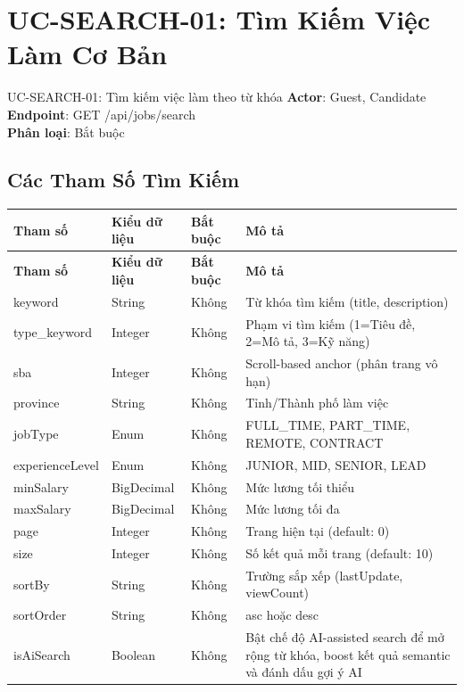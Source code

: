 \documentclass[12pt, a4paper]{report}
\begin{document}
\section{UC-SEARCH-01: Tìm Kiếm Việc Làm Cơ Bản}

\begin{requirementbox}{UC-SEARCH-01: Tìm kiếm việc làm theo từ khóa}
\textbf{Actor}: Guest, Candidate \\
\textbf{Endpoint}: GET /api/jobs/search \\
\textbf{Phân loại}: Bắt buộc
\end{requirementbox}

\subsection{Các Tham Số Tìm Kiếm}

\begin{longtable}{|p{3.5cm}|p{2.5cm}|p{2.5cm}|p{5cm}|}
\hline
\textbf{Tham số} & \textbf{Kiểu dữ liệu} & \textbf{Bắt buộc} & \textbf{Mô tả} \\
\hline
\endfirsthead
\hline
\textbf{Tham số} & \textbf{Kiểu dữ liệu} & \textbf{Bắt buộc} & \textbf{Mô tả} \\
\hline
\endhead
keyword & String & Không & Từ khóa tìm kiếm (title, description) \\
\hline
type\_keyword & Integer & Không & Phạm vi tìm kiếm (1=Tiêu đề, 2=Mô tả, 3=Kỹ năng) \\
\hline
sba & Integer & Không & Scroll-based anchor (phân trang vô hạn) \\
\hline
province & String & Không & Tỉnh/Thành phố làm việc \\
\hline
jobType & Enum & Không & FULL\_TIME, PART\_TIME, REMOTE, CONTRACT \\
\hline
experienceLevel & Enum & Không & JUNIOR, MID, SENIOR, LEAD \\
\hline
minSalary & BigDecimal & Không & Mức lương tối thiểu \\
\hline
maxSalary & BigDecimal & Không & Mức lương tối đa \\
\hline
page & Integer & Không & Trang hiện tại (default: 0) \\
\hline
size & Integer & Không & Số kết quả mỗi trang (default: 10) \\
\hline
sortBy & String & Không & Trường sắp xếp (lastUpdate, viewCount) \\
\hline
sortOrder & String & Không & asc hoặc desc \\
\hline
isAiSearch & Boolean & Không & Bật chế độ AI-assisted search để mở rộng từ khóa, boost kết quả semantic và đánh dấu gợi ý AI \\
\hline
\end{longtable}
\end{document}
